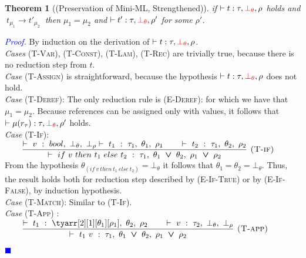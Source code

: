 \documentclass[a4paper,11pt,oneside]{article}
\theoremstyle{plain}
\newtheorem{theorem}[definition]{Theorem}
\renewenvironment{proof}{\noindent \begin{adjustwidth}{1.5em}{} \textcolor{blue}{\textit{Proof.}}}
{{\begin{tiny}\textcolor{blue}{$\blacksquare$}\end{tiny}}
\end{adjustwidth}~\\\noindent}
\newcommand{\bvee}{\boldsymbol{~\vee~}}
\newcommand{\typing}[4]{\vdash~#1~:~#2,~#3,~#4}
\newcommand{\bth}{\bot_\theta}
\newcommand{\brh}{\bot_\rho}
\newcommand{\evalstep}[4]{~#1_{\mu_#2} \rightarrow #3_{\mu_#4} ~}
\newcommand{\mem}{_{\mu}}\newcommand{\memp}{_{\mu'}}
\newcommand{\ghead}[2]{~#1~\stackrel{\epsilon}{\rightarrow}~#2~}
\begin{document}
\hypertarget{proof:preserv-prop-p}{} 
\begin{theorem}[(Preservation of Mini-ML, Strengthened)] 
if $\vdash t : \tau, \textcolor{red}{\bth}, \rho$ holds and $\evalstep{t}{1}{t'}{2}$ then $\mu_1 = \mu_2$ and $\vdash t' : \tau, \textcolor{red}{\bth}, \rho'$ for some $\rho'$.

\end{theorem}
\begin{proof}
\label{proof:preserv-prop-p}
  By induction on the derivation of $\vdash t : \tau, \textcolor{red}{\bth}, \rho$.\\
  
  \noindent\textit{Cases} \textsc{(T-Var), (T-Const), (T-Lam), (T-Rec)}  are trivially true, because there is no reduction step from $t$. \\
  
  \noindent\textit{Case} \textsc{(T-Assign)} is straightforward, because the hypothesis 
  $\vdash t : \tau, \textcolor{red}{\bth}, \rho $ does not hold.\\
  
   \noindent\textit{Case} \textsc{(T-Deref)}: The only reduction rule is \textsc{(E-Deref)}:  \infax[E-Deref]{\ghead{{!r_\tau}_{\mem}} {\mu_{}(r_\tau)}}
    for which we have that $\mu_1 = \mu_2$.  
    Because references can be assigned only with values, it follows that $\vdash \mu(r_\tau) : \tau, \textcolor{red}{\bth}, \rho' $ holds. \\ 

  \noindent\textit{Case} \textsc{(T-If)}: $\qquad \dfrac
	{
		\typing{v}{bool}{\bth}{\brh}
		\typing{t_1}{\tau_1}{\theta_1}{\rho_1} \qquad
		\typing{t_2}{\tau_1}{\theta_2}{\rho_2}
	}
	{	\typing{if~v~then~t_1~else~t_2}
		{\tau_1}{\theta_1 \bvee \theta_2}{\rho_1 \bvee \rho_2}}
	{\textsc{  (T-if)}}$ \\
  
	From the hypothesis $\theta_{(if~v~then~t_1~else~t_2)} = \bth$ it follows that $\theta_1 = \theta_2 = \bth$. Thus, the result holds both for reduction step described by \textsc{(E-If-True)} or by \textsc{(E-If-False)}, by induction hypothesis. \\
   
  \noindent\textit{Case} \textsc{(T-Match)}: \qquad Similar to \textsc{(T-If)}. \\
   
   \noindent\textit{Case} \textsc{(T-App)} : $\qquad \dfrac
	{
		\typing{t_1}{\tyarr[2][1][\theta_1][\rho_1]}{\theta_2}{\rho_2} \qquad
		\typing{v}{\tau_2}{\bth}{\brh}}
	{
		\typing{t_1~v}{\tau_1}{\theta_1 \bvee \theta_2}{\rho_1 \bvee \rho_2}}
	{
		\textsc{  (T-app)}} $ \\
		

\end{proof}
\end{document}
